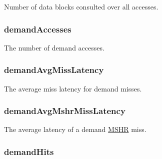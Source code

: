 \label{group__CacheStatistics_gad8dad26f755f9db669fc2b8dab657c0a}
Number of data blocks consulted over all accesses. \hypertarget{group__CacheStatistics_gae4b2f837d0d9919fe4ce7389922a001d}{
\subsubsection[{demandAccesses}]{ demandAccesses}}
\label{group__CacheStatistics_gae4b2f837d0d9919fe4ce7389922a001d}
The number of demand accesses. \hypertarget{group__CacheStatistics_ga4a5f08d40501e08ed841c65206fc7757}{
\subsubsection[{demandAvgMissLatency}]{ demandAvgMissLatency}}
\label{group__CacheStatistics_ga4a5f08d40501e08ed841c65206fc7757}
The average miss latency for demand misses. \hypertarget{group__CacheStatistics_ga0fba53068815c749879bd3ec5aed871f}{
\subsubsection[{demandAvgMshrMissLatency}]{ demandAvgMshrMissLatency}}
\label{group__CacheStatistics_ga0fba53068815c749879bd3ec5aed871f}
The average latency of a demand \hyperlink{classMSHR}{MSHR} miss. \hypertarget{group__CacheStatistics_gafc2d55cfff6a5b55a9c19bf5c7b13729}{
\subsubsection[{demandHits}]{ demandHits}}

